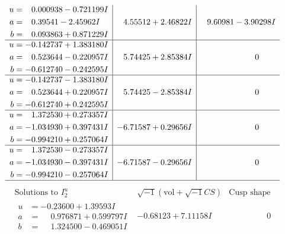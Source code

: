 \documentclass[1p]{elsarticle_modified}
\theoremstyle{definition}
\newcommand{\I}{\sqrt{-1}}
\begin{document}
$$\begin{array}{c|c|c}
\begin{aligned}
u &= \phantom{-}0.000938 - 0.721199 I \\
a &= \phantom{-}0.39541 - 2.45962 I \\
b &= \phantom{-}0.093863 + 0.871229 I\end{aligned}
 & \phantom{-}4.55512 + 2.46822 I & \phantom{-}9.60981 - 3.90298 I \\ \hline\begin{aligned}
u &= -0.142737 + 1.383180 I \\
a &= \phantom{-}0.523644 - 0.220957 I \\
b &= -0.612740 - 0.242595 I\end{aligned}
 & \phantom{-}5.74425 + 2.85384 I & \phantom{-0.000000 } 0 \\ \hline\begin{aligned}
u &= -0.142737 - 1.383180 I \\
a &= \phantom{-}0.523644 + 0.220957 I \\
b &= -0.612740 + 0.242595 I\end{aligned}
 & \phantom{-}5.74425 - 2.85384 I & \phantom{-0.000000 } 0 \\ \hline\begin{aligned}
u &= \phantom{-}1.372530 + 0.273357 I \\
a &= -1.034930 + 0.397431 I \\
b &= -0.994210 + 0.257064 I\end{aligned}
 & -6.71587 + 0.29656 I & \phantom{-0.000000 } 0 \\ \hline\begin{aligned}
u &= \phantom{-}1.372530 - 0.273357 I \\
a &= -1.034930 - 0.397431 I \\
b &= -0.994210 - 0.257064 I\end{aligned}
 & -6.71587 - 0.29656 I & \phantom{-0.000000 } 0\\
 \hline 
 \end{array}$$\newpage$$\begin{array}{c|c|c}  
\text{Solutions to }I^u_{2}& \I (\text{vol} + \sqrt{-1}CS) & \text{Cusp shape}\\
 \hline 
\begin{aligned}
u &= -0.23600 + 1.39593 I \\
a &= \phantom{-}0.976871 + 0.599797 I \\
b &= \phantom{-}1.324500 - 0.469051 I\end{aligned}
 & -0.68123 + 7.11158 I & \phantom{-0.000000 } 0 \\ \hline\begin{aligned}

\end{aligned}
\end{array}$$
\end{document}
